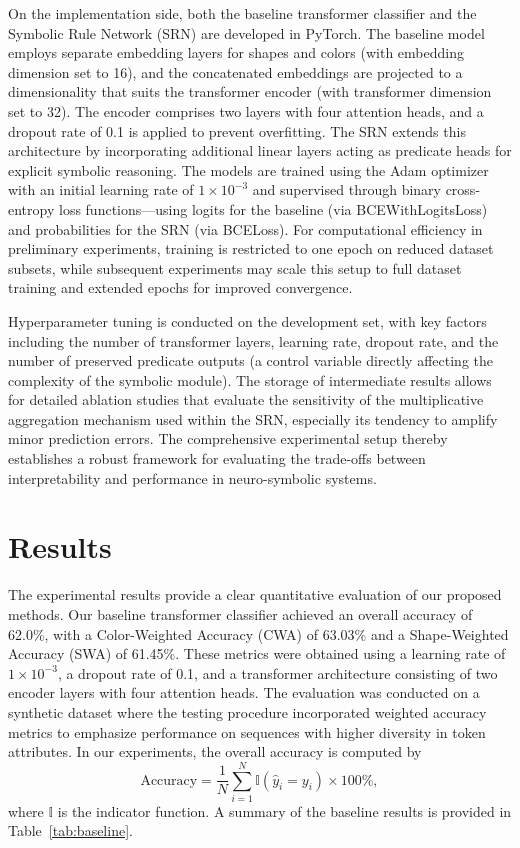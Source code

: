 \documentclass[11pt]{article}
\begin{document}
On the implementation side, both the baseline transformer classifier and the Symbolic Rule Network (SRN) are developed in PyTorch. The baseline model employs separate embedding layers for shapes and colors (with embedding dimension set to 16), and the concatenated embeddings are projected to a dimensionality that suits the transformer encoder (with transformer dimension set to 32). The encoder comprises two layers with four attention heads, and a dropout rate of 0.1 is applied to prevent overfitting. The SRN extends this architecture by incorporating additional linear layers acting as predicate heads for explicit symbolic reasoning. The models are trained using the Adam optimizer with an initial learning rate of \(1 \times 10^{-3}\) and supervised through binary cross-entropy loss functions—using logits for the baseline (via BCEWithLogitsLoss) and probabilities for the SRN (via BCELoss). For computational efficiency in preliminary experiments, training is restricted to one epoch on reduced dataset subsets, while subsequent experiments may scale this setup to full dataset training and extended epochs for improved convergence.

Hyperparameter tuning is conducted on the development set, with key factors including the number of transformer layers, learning rate, dropout rate, and the number of preserved predicate outputs (a control variable directly affecting the complexity of the symbolic module). The storage of intermediate results allows for detailed ablation studies that evaluate the sensitivity of the multiplicative aggregation mechanism used within the SRN, especially its tendency to amplify minor prediction errors. The comprehensive experimental setup thereby establishes a robust framework for evaluating the trade-offs between interpretability and performance in neuro-symbolic systems.

\section{Results}
The experimental results provide a clear quantitative evaluation of our proposed methods. Our baseline transformer classifier achieved an overall accuracy of 62.0\%, with a Color-Weighted Accuracy (CWA) of 63.03\% and a Shape-Weighted Accuracy (SWA) of 61.45\%. These metrics were obtained using a learning rate of \(1\times10^{-3}\), a dropout rate of 0.1, and a transformer architecture consisting of two encoder layers with four attention heads. The evaluation was conducted on a synthetic dataset where the testing procedure incorporated weighted accuracy metrics to emphasize performance on sequences with higher diversity in token attributes. In our experiments, the overall accuracy is computed by
\[
\text{Accuracy} = \frac{1}{N}\sum_{i=1}^{N} \mathbb{I}(\hat{y}_i = y_i) \times 100\%,
\]
where \(\mathbb{I}\) is the indicator function. A summary of the baseline results is provided in Table~\ref{tab:baseline}.
\end{document}
